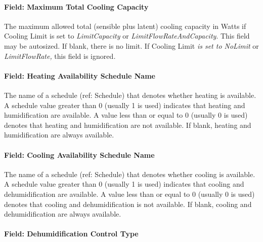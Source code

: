 \paragraph{Field: Maximum Total Cooling Capacity}\label{field-maximum-total-cooling-capacity}

The maximum allowed total (sensible plus latent) cooling capacity in Watts if Cooling Limit is set to \emph{LimitCapacity} or \emph{LimitFlowRateAndCapacity}. This field may be autosized. If blank, there is no limit. If Cooling Limit \emph{is set to NoLimit} or \emph{LimitFlowRate,} this field is ignored\emph{.}

\paragraph{Field: Heating Availability Schedule Name}\label{field-heating-availability-schedule-name-000}

The name of a schedule (ref: Schedule) that denotes whether heating is available. A schedule value greater than 0 (usually 1 is used) indicates that heating and humidification are available. A value less than or equal to 0 (usually 0 is used) denotes that heating and humidification are not available. If blank, heating and humidification are always available.

\paragraph{Field: Cooling Availability Schedule Name}\label{field-cooling-availability-schedule-name-000}

The name of a schedule (ref: Schedule) that denotes whether cooling is available. A schedule value greater than 0 (usually 1 is used) indicates that cooling and dehumidification are available. A value less than or equal to 0 (usually 0 is used) denotes that cooling and dehumidification is not available. If blank, cooling and dehumidification are always available.

\paragraph{Field: Dehumidification Control Type}\label{field-dehumidification-control-type-000}

